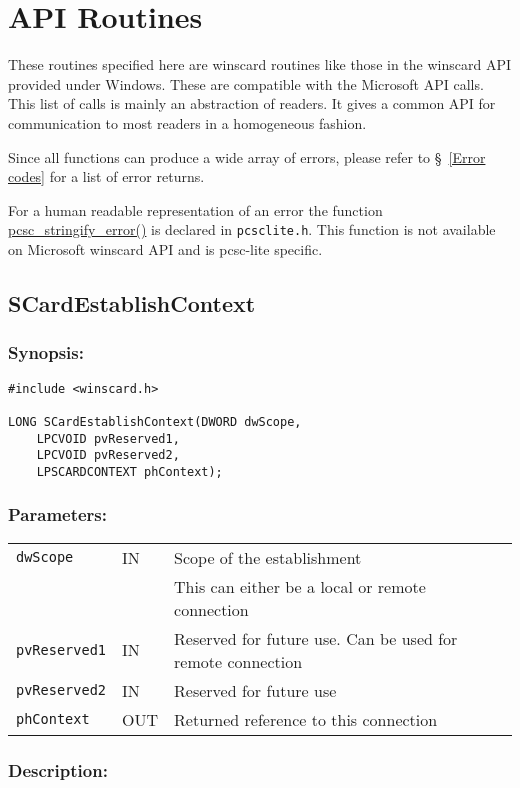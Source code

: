 \documentclass[a4paper,12pt]{article}
\newcommand{\synopsis}{\subsubsection{Synopsis:}}
\newcommand{\parameters}{\subsubsection{Parameters:}}
\newcommand{\desc}{\subsubsection{Description:}}
\begin{document}
\section{API Routines}

These routines specified here are winscard routines like those in the
winscard API provided under Windows{\textregistered}. These are
compatible with the Microsoft{\textregistered} API calls. This list of
calls is mainly an abstraction of readers. It gives a common API for
communication to most readers in a homogeneous fashion.

Since all functions can produce a wide array of errors, please refer to
\S~\vref{Error codes} for a list of error returns.

For a human readable representation of an error the function
\url{pcsc_stringify_error()} is declared in \texttt{pcsclite.h}.
This function is not available on Microsoft{\textregistered} winscard
API and is pcsc-lite specific.


\subsection{SCardEstablishContext}

\synopsis
\begin{verbatim}
#include <winscard.h>

LONG SCardEstablishContext(DWORD dwScope,
    LPCVOID pvReserved1,
    LPCVOID pvReserved2,
    LPSCARDCONTEXT phContext);
\end{verbatim}

\parameters

\begin{tabular}{lll}
\texttt{dwScope} & IN & Scope of the establishment \\
 & & This can either be a local or remote connection\\

\texttt{pvReserved1} & IN & Reserved for future use. Can be used for remote
connection \\

\texttt{pvReserved2} & IN & Reserved for future use \\
\texttt{phContext} & OUT & Returned reference to this connection \\
\end{tabular}

\desc
\end{document}
